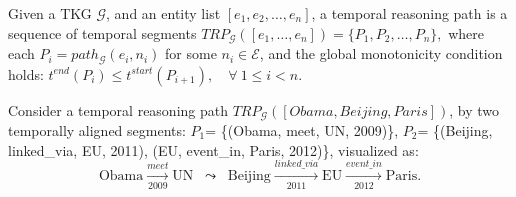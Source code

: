 \begin{definition}  
Given a TKG $\mathcal{G}$, and an entity list $[e_1,e_2,\ldots,e_n]$, a temporal reasoning path is a sequence of temporal segments
$
TRP_{\mathcal{G}}([e_1,\ldots,e_n]) = \{P_1,P_2,\ldots,P_{n}\},
$
where each $P_i = path_{\mathcal{G}}(e_i,n_i)$ for some $n_i \in \mathcal{E}$,  
and the global monotonicity condition holds:
$
t^{end}(P_i) \leq t^{start}(P_{i+1}), \quad \forall~1 \leq i < n.
$
\end{definition}



\begin{example}
Consider a temporal reasoning path $TRP_{\mathcal{G}}([{Obama}, {Beijing}, {Paris}])$, by two temporally aligned segments:
$P_1$= \{(Obama, meet, UN, 2009)\}, $P_2$= \{(Beijing, linked\_via, EU, 2011), (EU, event\_in, Paris, 2012)\}, visualized as:
\[
\text{Obama} \xrightarrow[\text{2009}]{\textit{meet}} 
\text{UN} 
\;\;\leadsto\;\;
\text{Beijing} \xrightarrow[\text{2011}]{\textit{linked\_via}} 
\text{EU} \xrightarrow[\text{2012}]{\textit{event\_in}} 
\text{Paris}.
\]
\end{example}



